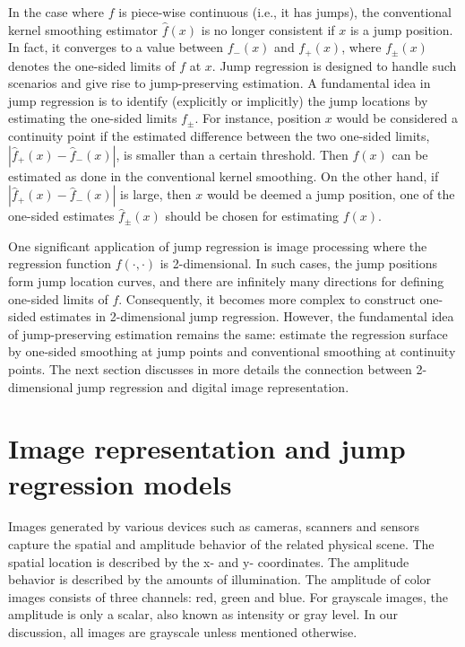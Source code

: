 In the case where \(f\) is piece-wise continuous (i.e., it has jumps), the conventional kernel smoothing estimator \(\widehat{f}(x)\) is no longer consistent if \(x\) is a jump position. In fact, it converges to a value between \(f_{-}(x)\) and \(f_{+}(x)\), where \(f_{\pm} (x)\) denotes the one-sided limits of \(f\) at \(x\). Jump regression is designed to handle such scenarios and give rise to jump-preserving estimation. A fundamental idea in jump regression is to identify (explicitly or implicitly) the jump locations by estimating the one-sided limits \(f_{\pm}\). For instance, position \(x\) would be considered a continuity point if the estimated difference between the two one-sided limits, \(|\widehat{f}_+(x) - \widehat{f}_{-}(x)|\), is smaller than a certain threshold. Then \(f(x)\) can be estimated as done in the conventional kernel smoothing. On the other hand, if \(|\widehat{f}_+(x) - \widehat{f}_{-}(x)|\) is large, then \(x\) would be deemed a jump position, one of the one-sided estimates \(\widehat{f}_{\pm}(x)\) should be chosen for estimating \(f(x)\).

One significant application of jump regression is image processing where the regression function \(f(\cdot, \cdot)\) is 2-dimensional. In such cases, the jump positions form jump location curves, and there are infinitely many directions for defining one-sided limits of \(f\). Consequently, it becomes more complex to construct one-sided estimates in 2-dimensional jump regression. However, the fundamental idea of jump-preserving estimation remains the same: estimate the regression surface by one-sided smoothing at jump points and conventional smoothing at continuity points. The next section discusses in more details the connection between 2-dimensional jump regression and digital image representation.

\section{Image representation and jump regression models}\label{sec:models}

Images generated by various devices such as cameras, scanners and sensors capture the spatial and amplitude behavior of the related physical scene. The spatial location is described by the x- and y- coordinates. The amplitude behavior is described by the amounts of illumination. The amplitude of color images consists of three channels: red, green and blue. For grayscale images, the amplitude is only a scalar, also known as intensity or gray level. In our discussion, all images are grayscale unless mentioned otherwise.

